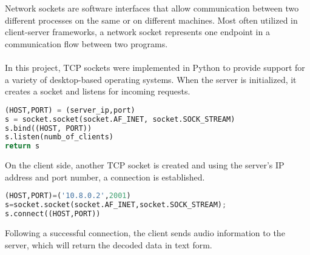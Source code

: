 Network sockets are software interfaces that allow communication between two different processes on the same or on different machines.
Most often utilized in client-server frameworks, a network socket represents one endpoint in a communication flow between two programs.\\\\
In this project, TCP sockets were implemented in Python to provide support for a variety of desktop-based operating systems.
When the server is initialized, it creates a socket and listens for incoming requests.
\begin{lstlisting}[language=Python, flexiblecolumns=true, caption=Server initialization.]
(HOST,PORT) = (server_ip,port)
s = socket.socket(socket.AF_INET, socket.SOCK_STREAM)
s.bind((HOST, PORT))
s.listen(numb_of_clients)
return s
\end{lstlisting}
On the client side, another TCP socket is created and using the server's IP address and port number, a connection is established. 
\begin{lstlisting}[language=Python, flexiblecolumns=true, caption=Client initialization.]
(HOST,PORT)=('10.8.0.2',2001)
s=socket.socket(socket.AF_INET,socket.SOCK_STREAM);
s.connect((HOST,PORT))
\end{lstlisting}
Following a successful connection, the client sends audio information to the server, which will return the decoded data in text form. 